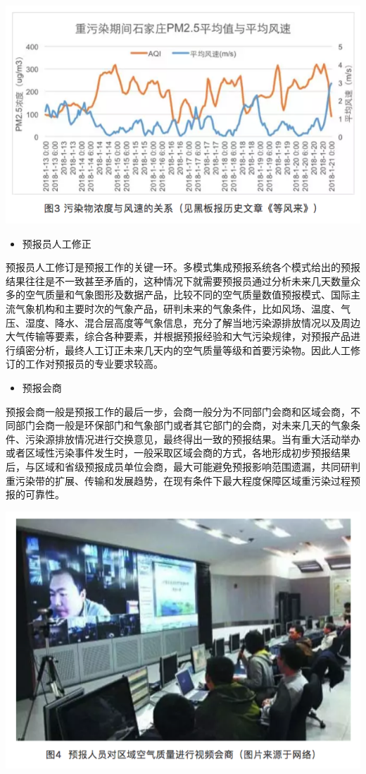 \documentclass[
]{book}
\providecommand{\tightlist}{%
  \setlength{\itemsep}{0pt}\setlength{\parskip}{0pt}}
\begin{document}
\includegraphics[width=8.33in]{images/kqyb3}

\begin{itemize}
\tightlist
\item
  预报员人工修正
\end{itemize}

预报员人工修订是预报工作的关键一环。多模式集成预报系统各个模式给出的预报结果往往是不一致甚至矛盾的，这种情况下就需要预报员通过分析未来几天数量众多的空气质量和气象图形及数据产品，比较不同的空气质量数值预报模式、国际主流气象机构和主要时次的气象产品，研判未来的气象条件，比如风场、温度、气压、湿度、降水、混合层高度等气象信息，充分了解当地污染源排放情况以及周边大气传输等要素，综合各种要素，并根据预报经验和大气污染规律，对预报产品进行缜密分析，最终人工订正未来几天内的空气质量等级和首要污染物。因此人工修订的工作对预报员的专业要求较高。

\begin{itemize}
\tightlist
\item
  预报会商
\end{itemize}

预报会商一般是预报工作的最后一步，会商一般分为不同部门会商和区域会商，不同部门会商一般是环保部门和气象部门或者其它部门的会商，对未来几天的气象条件、污染源排放情况进行交换意见，最终得出一致的预报结果。当有重大活动举办或者区域性污染事件发生时，一般采取区域会商的方式，各地形成初步预报结果后，与区域和省级预报成员单位会商，最大可能避免预报影响范围遗漏，共同研判重污染带的扩展、传输和发展趋势，在现有条件下最大程度保障区域重污染过程预报的可靠性。

\includegraphics[width=8.33in]{images/kqyb4}
\end{document}
